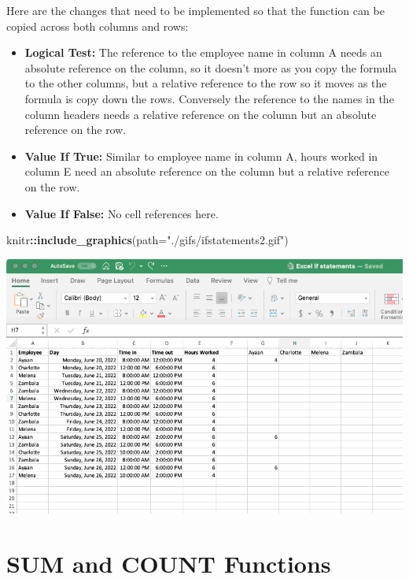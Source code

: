 \documentclass[
]{book}
\newenvironment{Shaded}{\begin{snugshade}}{\end{snugshade}}
\newcommand{\AttributeTok}[1]{\textcolor[rgb]{0.13,0.29,0.53}{#1}}
\newcommand{\FunctionTok}[1]{\textcolor[rgb]{0.13,0.29,0.53}{\textbf{#1}}}
\newcommand{\NormalTok}[1]{#1}
\newcommand{\SpecialCharTok}[1]{\textcolor[rgb]{0.81,0.36,0.00}{\textbf{#1}}}
\newcommand{\StringTok}[1]{\textcolor[rgb]{0.31,0.60,0.02}{#1}}
\begin{document}
Here are the changes that need to be implemented so that the function can be copied across both columns and rows:

\begin{itemize}
\item
  \textbf{Logical Test:} The reference to the employee name in column A needs an absolute reference on the column, so it doesn't more as you copy the formula to the other columns, but a relative reference to the row so it moves as the formula is copy down the rows. Conversely the reference to the names in the column headers needs a relative reference on the column but an absolute reference on the row.
\item
  \textbf{Value If True:} Similar to employee name in column A, hours worked in column E need an absolute reference on the column but a relative reference on the row.
\item
  \textbf{Value If False:} No cell references here.
\end{itemize}

\begin{Shaded}
\begin{Highlighting}[]
\NormalTok{knitr}\SpecialCharTok{::}\FunctionTok{include\_graphics}\NormalTok{(}\AttributeTok{path=}\StringTok{"./gifs/ifstatements2.gif"}\NormalTok{)}
\end{Highlighting}
\end{Shaded}

\includegraphics{./gifs/ifstatements2.gif}

\hypertarget{sum-and-count-functions}{%
\section{SUM and COUNT Functions}\label{sum-and-count-functions}}
\end{document}
